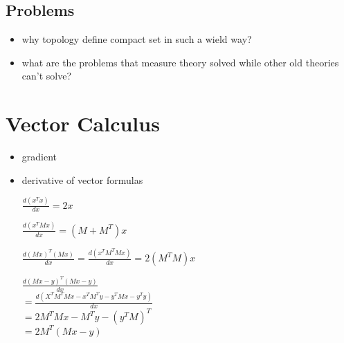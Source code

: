 \documentclass[10pt,a4paper]{book}
\begin{document}
\subsection {Problems}
\begin{itemize}

	
	\item why topology define compact set in such a wield way?
	
	\item what are the problems that measure theory solved while other old theories can't solve?
\end{itemize}


\section{Vector Calculus}
\begin{itemize}
	\item gradient
	\item derivative of vector formulas
	
	$\frac {d(x^Tx)} {dx} = 2x$
	
	$\frac {d(x^TMx)} {dx} = (M+M^T)x$
	
	$\frac {d(Mx)^T(Mx)} {dx} = \frac {d(x^TM^TMx)} {dx} = 2(M^TM)x $
	
	$\frac {d(Mx-y)^T(Mx-y)} {dx} $\\
	$= \frac {d (X^TM^TMx - x^TM^Ty - y^TMx - y^Ty ) } {dx} $\\
	$= 2M^TMx -M^Ty - (y^TM)^T$\\
	$= 2M^T(Mx - y) $
\end{itemize} 
\end{document}
